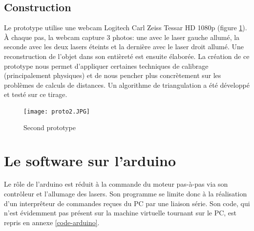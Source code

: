 \documentclass[a4paper,10pt]{report}
\begin{document}
\subsection{Construction}

Le prototype utilise une webcam Logitech Carl Zeiss Tessar HD 1080p (figure \ref{proto}). À chaque pas, la webcam capture 3 photos: une avec le laser gauche allumé, la seconde avec les deux lasers éteints et la dernière avec le laser droit allumé. Une reconstruction de l'objet dans son entièreté est ensuite élaborée. La création de ce prototype nous permet d'appliquer certaines techniques de calibrage (principalement physiques) et de nous pencher plus concrètement sur les problèmes de calculs de distances. Un algorithme de triangulation a été développé et testé sur ce tirage.

\begin{figure}[h!]
\centering
\texttt{[image: proto2.JPG]}
\caption{Second prototype}
\label{proto}
\end{figure}

\section{Le software sur l'arduino}
Le rôle de l'arduino est réduit à la commande du moteur pas-à-pas via son contrôleur et l'allumage des lasers. Son programme se limite donc à la réalisation d'un interprêteur de commandes reçues du PC par une liaison série. Son code, qui n'est évidemment pas présent sur la machine virtuelle tournant sur le PC, est repris en annexe \ref{code-arduino}.
\end{document}
